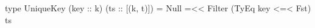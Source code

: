 \begin{code}
type UniqueKey (key :: k) (ts :: [(k, t)])
  = Null =<< Filter (TyEq key <=< Fst) ts
\end{code}
